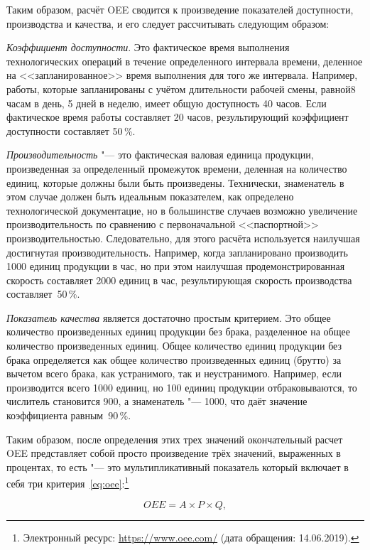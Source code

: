 Таким образом, расчёт OEE сводится к произведение показателей доступности, производства и качества, и его следует рассчитывать следующим образом:

\textit{Коэффициент доступности}. Это фактическое время выполнения технологических операций в течение определенного интервала времени, деленное на <<запланированное>> время выполнения для того же интервала. Например, работы, которые запланированы с учётом длительности рабочей смены, равной8 часам в день, 5 дней в неделю, имеет общую доступность 40 часов. Если фактическое время работы составляет 20 часов, результирующий коэффициент доступности составляет 50\,\%.

\textit{Производительность} "--- это фактическая валовая единица продукции, произведенная за определенный промежуток времени, деленная на количество единиц, которые должны были быть произведены. Технически, знаменатель в этом случае должен быть идеальным показателем, как определено технологической документацие, но в большинстве случаев возможно увеличение производительность по сравнению с первоначальной <<паспортной>> производительностью. Следовательно, для этого расчёта используется наилучшая достигнутая производительность. Например, когда запланировано производить 1000 единиц продукции в час, но при этом наилучшая продемонстрированная скорость составляет 2000 единиц в час, результирующая скорость производства составляет~50\,\%.

\textit{Показатель качества} является достаточно простым критерием. Это общее количество произведенных единиц продукции без брака, разделенное на общее количество произведенных единиц. Общее количество единиц продукции без брака определяется как общее количество произведенных единиц (брутто) за вычетом всего брака, как устранимого, так и неустранимого. Например, если производится всего 1000 единиц, но 100 единиц продукции отбраковываются, то числитель становится 900, а знаменатель "--- 1000, что даёт значение коэффициента равным~90\,\%.

Таким образом, после определения этих трех значений окончательный расчет OEE представляет собой просто произведение трёх значений, выраженных в процентах, то есть "--- это мультипликативный показатель который включает в себя три критерия~\cref{eq:oee}:\footnote{Электронный ресурс: \url{https://www.oee.com/} (дата обращения: 14.06.2019).}

\begin{equation}
OEE = A \times P \times Q,
\label{eq:oee}
\end{equation} 

